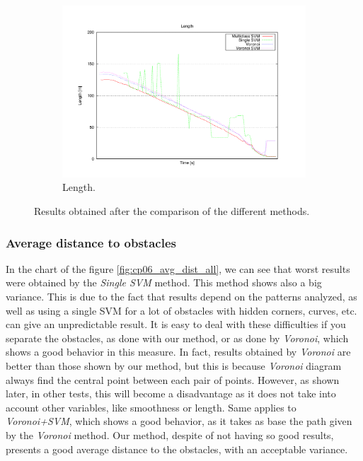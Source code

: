 \begin{figure}
  \ContinuedFloat
  \begin{subfigure}[b]{\textwidth}
	  \centering
	  \includegraphics[width=\textwidth,height=0.5\textwidth, trim=55 50 85 60,clip]{figure13}
	  \caption{Length.}
	  \label{fig:cp06_length_all}
  \end{subfigure}
  
  \caption{Results obtained after the comparison of the different methods.}\label{fig:cp06_results_comparison}
\end{figure}

\subsubsection{Average distance to obstacles}\label{ch:chapter06_02_02_01}

In the chart of the figure \ref{fig:cp06_avg_dist_all}, we can see that worst results were obtained by the \textit{Single \ac{SVM}} method. This method shows also a big variance. This is due to the fact that results depend on the patterns analyzed, as well as using a single \ac{SVM} for a lot of obstacles with hidden corners, curves, etc. can give an unpredictable result. It is easy to deal with these difficulties if you separate the obstacles, as done with our method, or as done by \textit{Voronoi}, which shows a good behavior in this measure. In fact, results obtained by \textit{Voronoi} are better than those shown by our method, but this is because \textit{Voronoi} diagram always find the central point between each pair of points. However, as shown later, in other tests, this will become a disadvantage as it does not take into account other variables, like smoothness or length. Same applies to \textit{Voronoi+\ac{SVM}}, which shows a good behavior, as it takes as base the path given by the \textit{Voronoi} method.
Our method, despite of not having so good results, presents a good average distance to the obstacles, with an acceptable variance.

